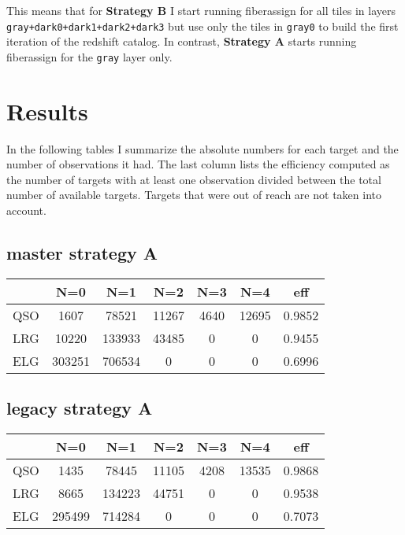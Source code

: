 \documentclass{article}
\begin{document}
This means that for \textbf{Strategy B} I start running fiberassign for all tiles in layers \verb'gray+dark0+dark1+dark2+dark3' but use only the tiles in \verb'gray0' to build the first iteration of the redshift catalog. 
In contrast,  \textbf{Strategy A} starts running fiberassign for the \verb'gray' layer only.



\section{Results}

In the following tables I summarize the absolute numbers for 
each target and the number of observations it had. The last column
lists the efficiency computed as the number of targets with at least
one observation divided between the total number of available targets.
Targets that were out of reach are not taken into account.

\newpage

\subsection*{master strategy A}
\begin{center}
\begin{tabular}{l|ccccc|c}
 & N=0 & N=1 & N=2 & N=3 & N=4 & eff\\\hline
QSO & 1607 & 78521 & 11267 & 4640 & 12695 & 0.9852\\
LRG & 10220 & 133933 & 43485 & 0 & 0 &  0.9455\\
ELG & 303251& 706534 & 0& 0 & 0 & 0.6996
\end{tabular}
\end{center}

\subsection*{legacy strategy A}
\begin{center}
\begin{tabular}{l|ccccc|c}
 & N=0 & N=1 & N=2 & N=3 & N=4 & eff\\\hline
QSO & 1435& 78445& 11105& 4208& 13535 &  0.9868\\
LRG & 8665& 134223& 44751& 0& 0& 0.9538\\
ELG & 295499& 714284& 0& 0& 0 & 0.7073\\
\end{tabular}
\end{center}
\end{document}
